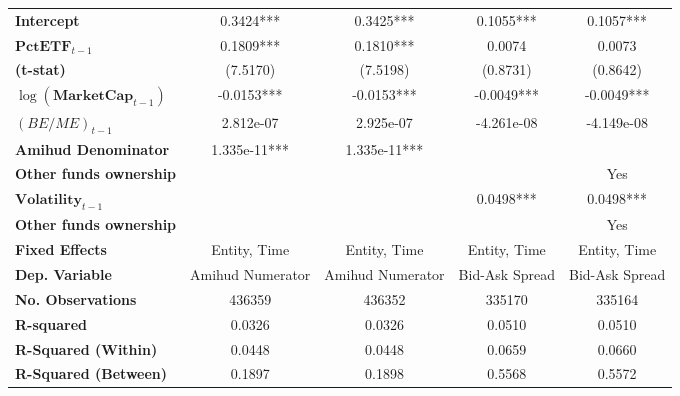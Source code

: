 {\begin{longtable}{>{\bfseries}lcccc}
Intercept                         &        0.3424***       &             0.3425***             &        0.1055***       &              0.1057***              \\
\rowcolor{blue!20}
$\mathbf{PctETF}_{t-1}$           &        0.1809***       &             0.1810***             &        0.0074       &              0.0073              \\
(t-stat)                                 &       (7.5170)      &            (7.5198)            &       (0.8731)      &             (0.8642)             \\
$\log(\mathbf{MarketCap}_{t-1})$    &       -0.0153***       &            -0.0153***             &       -0.0049***       &             -0.0049***              \\
$\left(BE/ME\right)_{t-1}$      &      2.812e-07      &           2.925e-07            &      -4.261e-08     &            -4.149e-08            \\
Amihud Denominator                 &      1.335e-11***      &           1.335e-11***            &                     &                                  \\
Other funds ownership &  &  &   & Yes\\
$\mathbf{Volatility}_{t-1}$                  &                     &                                &        0.0498***       &              0.0498***              \\
Other funds ownership &  &  &  & Yes\\
\midrule
Fixed Effects                           &        Entity, Time       &             Entity, Time        &        Entity, Time       &              Entity, Time \\
\bottomrule
\toprule
\textbf{Dep. Variable}                     &   Amihud Numerator   &        Amihud Numerator         &   Bid-Ask Spread   &         Bid-Ask Spread          \\
\textbf{No. Observations}                  &        436359       &             436352             &        335170       &              335164              \\
\textbf{R-squared}                         &        0.0326       &             0.0326             &        0.0510       &              0.0510              \\
\textbf{R-Squared (Within)}                &        0.0448       &             0.0448             &        0.0659       &              0.0660              \\
\textbf{R-Squared (Between)}               &        0.1897       &             0.1898             &        0.5568       &              0.5572              \\

\end{longtable}}
